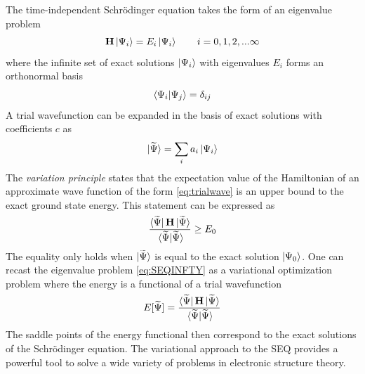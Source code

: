 The time-independent Schrödinger equation takes the form of an eigenvalue problem
\begin{equation}
\mathbf{H} \ket{\Psi_i} = E_i \ket{\Psi_i} \qquad i=0,1,2,...\infty
\label{eq:SEQINFTY}
\end{equation}
\noindent where the infinite set of exact solutions $\ket{\Psi_i}$ with eigenvalues $E_i$ forms an orthonormal basis
\begin{equation}
\bra{\Psi_i}\ket{\Psi_j} = \delta_{ij}
\end{equation} 
\noindent A trial wavefunction can be expanded in the basis of exact solutions with coefficients $c$ as
\begin{equation}
\ket{\smash{\widetilde{\Psi}}} = \sum_i a_i \ket{\Psi_i}
\label{eq:trialwave}
\end{equation}
\noindent The \emph{variation principle} states that the expectation value of the Hamiltonian of an approximate wave function of the form \ref{eq:trialwave} is an upper bound to the exact ground state energy. This statement can be expressed as
\begin{equation}
\frac{\bra{\tPsi}\mbf{H}\ket{\tPsi}}{\vphantom{\widetilde{\Psi}} \bra{\tPsi}\ket{\tPsi}} \geq E_0
\end{equation}
\noindent The equality only holds when $\ket{\smash{\widetilde{\Psi}}}$ is equal to the exact solution $\ket{\Psi_0}$. One can recast the eigenvalue problem \ref{eq:SEQINFTY} as a variational optimization problem where the energy is a functional of a trial wavefunction
\begin{equation}
E[\tPsi] = \frac{\bra{\tPsi}\mbf{H}\ket{\tPsi}}{\vphantom{\widetilde{\Psi}} \bra{\tPsi}\ket{\tPsi}}
\end{equation}
\noindent The saddle points of the energy functional then correspond to the exact solutions of the Schrödinger equation. The variational approach to the SEQ provides a powerful tool to solve a wide variety of problems in electronic structure theory.

